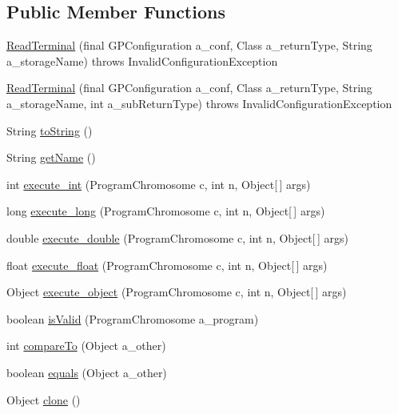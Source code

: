 \subsection*{Public Member Functions}
\begin{DoxyCompactItemize}
\item 
\hyperlink{classorg_1_1jgap_1_1gp_1_1function_1_1_read_terminal_a2500c5b441e749ff598b09bbc706c5de}{Read\-Terminal} (final G\-P\-Configuration a\-\_\-conf, Class a\-\_\-return\-Type, String a\-\_\-storage\-Name)  throws Invalid\-Configuration\-Exception 
\item 
\hyperlink{classorg_1_1jgap_1_1gp_1_1function_1_1_read_terminal_adebb005ab65539587ec2c09ff7fd7fda}{Read\-Terminal} (final G\-P\-Configuration a\-\_\-conf, Class a\-\_\-return\-Type, String a\-\_\-storage\-Name, int a\-\_\-sub\-Return\-Type)  throws Invalid\-Configuration\-Exception 
\item 
String \hyperlink{classorg_1_1jgap_1_1gp_1_1function_1_1_read_terminal_aaeb8012205d0ab7a5f3b53e7ecfe868d}{to\-String} ()
\item 
String \hyperlink{classorg_1_1jgap_1_1gp_1_1function_1_1_read_terminal_ad238ad532ac2a60e358368487d072c06}{get\-Name} ()
\item 
int \hyperlink{classorg_1_1jgap_1_1gp_1_1function_1_1_read_terminal_ab4001396483210e2da45c14a1c292e6b}{execute\-\_\-int} (Program\-Chromosome c, int n, Object\mbox{[}$\,$\mbox{]} args)
\item 
long \hyperlink{classorg_1_1jgap_1_1gp_1_1function_1_1_read_terminal_adb7fee4342fb38ff96c1d0db5b03aa9f}{execute\-\_\-long} (Program\-Chromosome c, int n, Object\mbox{[}$\,$\mbox{]} args)
\item 
double \hyperlink{classorg_1_1jgap_1_1gp_1_1function_1_1_read_terminal_a5e5e5111d66ab996ebf3a0d4aedfdb12}{execute\-\_\-double} (Program\-Chromosome c, int n, Object\mbox{[}$\,$\mbox{]} args)
\item 
float \hyperlink{classorg_1_1jgap_1_1gp_1_1function_1_1_read_terminal_a7ad052ec167c193016c8f525b63e8913}{execute\-\_\-float} (Program\-Chromosome c, int n, Object\mbox{[}$\,$\mbox{]} args)
\item 
Object \hyperlink{classorg_1_1jgap_1_1gp_1_1function_1_1_read_terminal_a933a47f84757011e4a60c67a3e3e1141}{execute\-\_\-object} (Program\-Chromosome c, int n, Object\mbox{[}$\,$\mbox{]} args)
\item 
boolean \hyperlink{classorg_1_1jgap_1_1gp_1_1function_1_1_read_terminal_a1eed3c38a40b42149b70455889f65940}{is\-Valid} (Program\-Chromosome a\-\_\-program)
\item 
int \hyperlink{classorg_1_1jgap_1_1gp_1_1function_1_1_read_terminal_a233055cab488ab73b758b7d4200d2747}{compare\-To} (Object a\-\_\-other)
\item 
boolean \hyperlink{classorg_1_1jgap_1_1gp_1_1function_1_1_read_terminal_a2977fd7b6aa2556f182a3b82d6f679ab}{equals} (Object a\-\_\-other)
\item 
Object \hyperlink{classorg_1_1jgap_1_1gp_1_1function_1_1_read_terminal_af69e4e8dbdfa28e1204487a60294d53c}{clone} ()
\end{DoxyCompactItemize}
